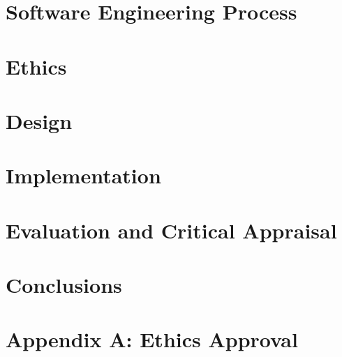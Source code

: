 \documentclass{article}
\begin{document}
\section{Software Engineering Process}
\label{section:proc}


\section{Ethics}
\label{section:ethi}


\section{Design}
\label{section:des}


\section{Implementation}
\label{section:impl}


\section{Evaluation and Critical Appraisal}
\label{section:eval}


\section{Conclusions}
\label{section:conc}


\newpage

\nocite{*}
\printbibliography

\appendix
\newpage
%

%

\section{Appendix A: Ethics Approval}
\label{section:ethics_append}

\end{document}
